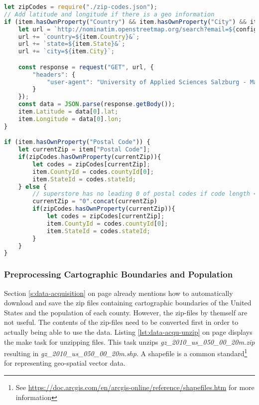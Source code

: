 \begin{lstlisting}[language=JavaScript, caption={Preprocessing Superstore-Sale with latitude and longitude}, label={lst:data-prep-latlong}]
let zipCodes = require("./zip-codes.json");
// Add latitude and longitude if there is a geo information
if (item.hasOwnProperty("Country") && item.hasOwnProperty("City") && item.hasOwnProperty("State")) {
    let url = `http://nominatim.openstreetmap.org/search?email=${config.email}&format=json&`;
    url += `country=${item.Country}&`;
    url += `state=${item.State}&`;
    url += `city=${item.City}`;

    const response = request("GET", url, {
        "headers": {
            "user-agent": "University of Applied Sciences Salzburg - Masterthesis Particles - MMT-M2014"
        }
    });
    const data = JSON.parse(response.getBody());
    item.Latitude = data[0].lat;
    item.Longitude = data[0].lon;
}

if (item.hasOwnProperty("Postal Code")) {
    let currentZip = item["Postal Code"];
    if(zipCodes.hasOwnProperty(currentZip)){
        let codes = zipCodes[currentZip];
        item.CountyId = codes.countyId[0];
        item.StateId = codes.stateId;
    } else {
        // superstore has no leading 0 of postal codes if code length < 5;
        currentZip = "0".concat(currentZip)
        if(zipCodes.hasOwnProperty(currentZip)){
            let codes = zipCodes[currentZip];
            item.CountyId = codes.countyId[0];
            item.StateId = codes.stateId;
        }
    }
}
\end{lstlisting}

\subsubsection{Preprocessing Cartographic Boundaries and Population}
Section \ref{s:data-acquisition} on page \pageref{s:data-acquisition} already mentions how to automatically download and save the zip files containing cartographic boundaries of the United States and the population of each county. However, the zip-files by themself are not useful. The contents of the zip-files need to be converted first in order to actually being able to use the data. Listing \ref{lst:data-acqu-unzip} on page \pageref{lst:data-acqu-unzip} displays the make task for unzipping files. This task unzips \textit{gz\_2010\_us\_050\_00\_20m.zip} resulting in \textit{gz\_2010\_us\_050\_00\_20m.shp}. A shapefile is a common standard\footnote{See \href{https://doc.arcgis.com/en/arcgis-online/reference/shapefiles.htm}{https://doc.arcgis.com/en/arcgis-online/reference/shapefiles.htm} for more information} for representing geo-spatial vector data.

